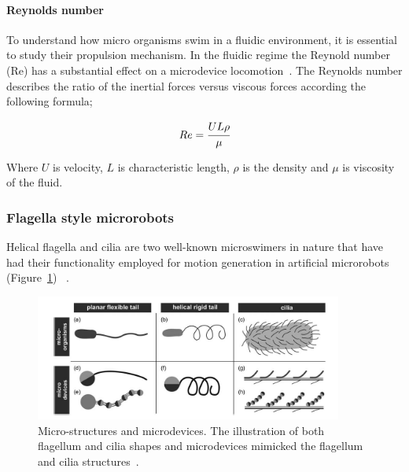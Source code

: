 \documentclass[12pt,a4paper,titlepage]{report}
\begin{document}
\paragraph{Reynolds number}

To understand how micro organisms swim in a fluidic environment, it is essential to study their propulsion 
mechanism. In the fluidic regime the Reynold number (Re) has a substantial effect on a microdevice
locomotion~\citep{peyer2013magnetic}. The Reynolds number describes the ratio of the inertial forces versus viscous 
forces according the following formula;

\begin{equation}
  Re = \cfrac{UL\rho}{\mu}
\label{eq:4}
\end{equation}
 
Where $ U$ is velocity, $L$ is characteristic length, $\rho$ is the density and $\mu$ is viscosity of the fluid.






\subsubsection{Flagella style microrobots}

Helical flagella and cilia are two well-known microswimers in nature that have had their functionality employed 
for motion generation in artificial microrobots  (Figure~\ref{cilia}) ~\citep{gao2013bioinspired}. 



\begin{figure}
  \centering
    \includegraphics[width=0.9\textwidth]{cilia}
  \caption[Micro-structures and microdevices]{Micro-structures and microdevices. The illustration of both flagellum and cilia shapes and microdevices mimicked the flagellum and cilia 
structures~\citep{peyer2013bio}.}
	
  \label{cilia}
\end{figure}
\end{document}
